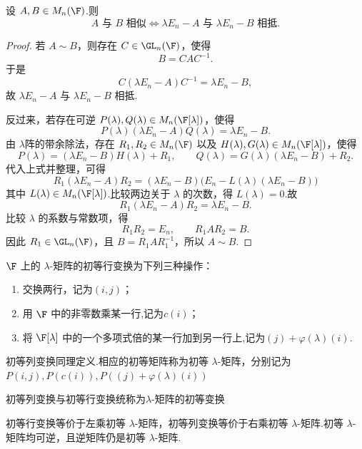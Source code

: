 \begin{proposition}
	设 $A,B\in M_n(\F)$.则
	\[
	A\text{ 与 }B\text{ 相似}
	\iff
	\lambda E_n-A\text{ 与 }\lambda E_n-B\text{ 相抵}.
	\]
\end{proposition}

\begin{proof}
	若 $A\sim B$，则存在 $C\in \GL_n(\F)$，使得
	\[
	B=CAC^{-1}.
	\]
	于是
	\[
	C(\lambda E_n-A)C^{-1}=\lambda E_n-B,
	\]
	故 $\lambda E_n-A$ 与 $\lambda E_n-B$ 相抵.
	
	反过来，若存在可逆 $P(\lambda),Q(\lambda)\in M_n(\F[\lambda])$，使得
	\[
	P(\lambda)(\lambda E_n-A)Q(\lambda)=\lambda E_n-B.
	\]
	由 $\lambda$阵的带余除法，存在 $R_1,R_2\in M_n(\F)$ 以及 $H(\lambda),G(\lambda)\in M_n(\F[\lambda])$，使得
	\[
	P(\lambda)=(\lambda E_n-B)H(\lambda)+R_1,
	\qquad
	Q(\lambda)=G(\lambda)(\lambda E_n-B)+R_2.
	\]
	代入上式并整理，可得
	\[
	R_1(\lambda E_n-A)R_2
	=(\lambda E_n-B)\bigl(E_n-L(\lambda)(\lambda E_n-B)\bigr)
	\]
	其中 $L(\lambda)\in M_n(\F[\lambda])$.比较两边关于 $\lambda$ 的次数，得 $L(\lambda)=0$.故
	\[
	R_1(\lambda E_n-A)R_2=\lambda E_n-B.
	\]
	比较 $\lambda$ 的系数与常数项，得
	\[
	R_1R_2=E_n,
	\qquad
	R_1AR_2=B.
	\]
	因此 $R_1\in \GL_n(\F)$，且 $B=R_1AR_1^{-1}$，所以 $A\sim B$.
\end{proof}

\begin{definition}[初等 $\lambda$-变换]\label{p1:concept:c5-l2058}
	$\F$ 上的 $\lambda$-矩阵的初等行变换为下列三种操作：
	\begin{enumerate}
		\item 交换两行，记为$(i,j)$；
		\item 用 $\F$ 中的非零数乘某一行,记为$c(i)$；
		\item 将 $\F[\lambda]$ 中的一个多项式倍的某一行加到另一行上,记为$(j) + \varphi (\lambda)(i)$.
	\end{enumerate}
	初等列变换同理定义.相应的初等矩阵称为初等 $\lambda$-矩阵，分别记为$P(i,j),P(c(i)),P((j)+\varphi(
	\lambda)(i))$
	
	初等列变换与初等行变换统称为$\lambda$-矩阵的初等变换
\end{definition}


	初等行变换等价于左乘初等 $\lambda$-矩阵，初等列变换等价于右乘初等 $\lambda$-矩阵.初等 $\lambda$-矩阵均可逆，且逆矩阵仍是初等 $\lambda$-矩阵.

